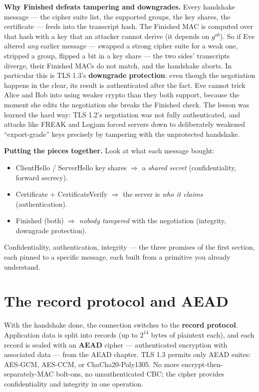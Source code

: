 \begin{whybox}
\textbf{Why Finished defeats tampering and downgrades.} Every handshake message ---
the cipher suite list, the supported groups, the key shares, the certificate ---
feeds into the transcript hash. The Finished MAC is computed over that hash with a
key that an attacker cannot derive (it depends on $g^{ab}$). So if Eve altered
\emph{any} earlier message --- swapped a strong cipher suite for a weak one,
stripped a group, flipped a bit in a key share --- the two sides' transcripts
diverge, their Finished MACs do not match, and the handshake aborts. In particular
this is TLS 1.3's \textbf{downgrade protection}: even though the negotiation
happens in the clear, its result is authenticated after the fact. Eve cannot trick
Alice and Bob into using weaker crypto than they both support, because the moment
she edits the negotiation she breaks the Finished check. The lesson was learned the
hard way: TLS 1.2's negotiation was not fully authenticated, and attacks like
FREAK and Logjam forced servers down to deliberately weakened ``export-grade'' keys
precisely by tampering with the unprotected handshake.
\end{whybox}

\begin{focusbox}
\textbf{Putting the pieces together.} Look at what each message bought:
\begin{itemize}
\item ClientHello / ServerHello key shares $\Rightarrow$ a \emph{shared secret}
(confidentiality, forward secrecy).
\item Certificate + CertificateVerify $\Rightarrow$ the server is \emph{who it
claims} (authentication).
\item Finished (both) $\Rightarrow$ \emph{nobody tampered} with the negotiation
(integrity, downgrade protection).
\end{itemize}
Confidentiality, authentication, integrity --- the three promises of the first
section, each pinned to a specific message, each built from a primitive you
already understand.
\end{focusbox}

\section{The record protocol and AEAD}

With the handshake done, the connection switches to the \textbf{record protocol}.
Application data is split into records (up to $2^{14}$ bytes of plaintext each),
and each record is sealed with an \textbf{AEAD} cipher --- authenticated
encryption with associated data --- from the AEAD chapter. TLS 1.3 permits only
AEAD suites: AES-GCM, AES-CCM, or ChaCha20-Poly1305. No more
encrypt-then-separately-MAC bolt-ons, no unauthenticated CBC; the cipher provides
confidentiality and integrity in one operation.

